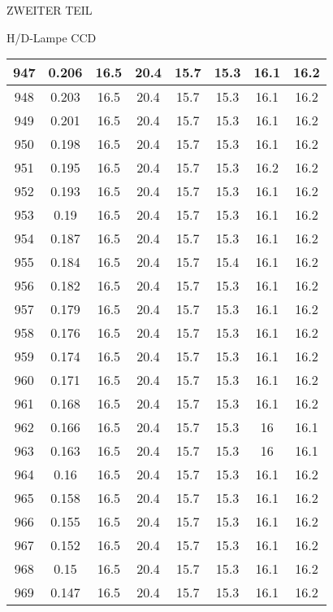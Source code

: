 \begin{appendix}
\begin{chapter}{ZWEITER TEIL}
\begin{section}{H/D-Lampe CCD}
\begin{scriptsize}
\begin{longtable}[htbp]{|c|c|c|c|c|c|c|c|}
            947 & 0.206 & 16.5 & 20.4 & 15.7 & 15.3 & 16.1 & 16.2 \\ \hline
            948 & 0.203 & 16.5 & 20.4 & 15.7 & 15.3 & 16.1 & 16.2 \\ \hline
            949 & 0.201 & 16.5 & 20.4 & 15.7 & 15.3 & 16.1 & 16.2 \\ \hline
            950 & 0.198 & 16.5 & 20.4 & 15.7 & 15.3 & 16.1 & 16.2 \\ \hline
            951 & 0.195 & 16.5 & 20.4 & 15.7 & 15.3 & 16.2 & 16.2 \\ \hline
            952 & 0.193 & 16.5 & 20.4 & 15.7 & 15.3 & 16.1 & 16.2 \\ \hline
            953 & 0.19 & 16.5 & 20.4 & 15.7 & 15.3 & 16.1 & 16.2 \\ \hline
            954 & 0.187 & 16.5 & 20.4 & 15.7 & 15.3 & 16.1 & 16.2 \\ \hline
            955 & 0.184 & 16.5 & 20.4 & 15.7 & 15.4 & 16.1 & 16.2 \\ \hline
            956 & 0.182 & 16.5 & 20.4 & 15.7 & 15.3 & 16.1 & 16.2 \\ \hline
            957 & 0.179 & 16.5 & 20.4 & 15.7 & 15.3 & 16.1 & 16.2 \\ \hline
            958 & 0.176 & 16.5 & 20.4 & 15.7 & 15.3 & 16.1 & 16.2 \\ \hline
            959 & 0.174 & 16.5 & 20.4 & 15.7 & 15.3 & 16.1 & 16.2 \\ \hline
            960 & 0.171 & 16.5 & 20.4 & 15.7 & 15.3 & 16.1 & 16.2 \\ \hline
            961 & 0.168 & 16.5 & 20.4 & 15.7 & 15.3 & 16.1 & 16.2 \\ \hline
            962 & 0.166 & 16.5 & 20.4 & 15.7 & 15.3 & 16 & 16.1 \\ \hline
            963 & 0.163 & 16.5 & 20.4 & 15.7 & 15.3 & 16 & 16.1 \\ \hline
            964 & 0.16 & 16.5 & 20.4 & 15.7 & 15.3 & 16.1 & 16.2 \\ \hline
            965 & 0.158 & 16.5 & 20.4 & 15.7 & 15.3 & 16.1 & 16.2 \\ \hline
            966 & 0.155 & 16.5 & 20.4 & 15.7 & 15.3 & 16.1 & 16.2 \\ \hline
            967 & 0.152 & 16.5 & 20.4 & 15.7 & 15.3 & 16.1 & 16.2 \\ \hline
            968 & 0.15 & 16.5 & 20.4 & 15.7 & 15.3 & 16.1 & 16.2 \\ \hline
            969 & 0.147 & 16.5 & 20.4 & 15.7 & 15.3 & 16.1 & 16.2 \\ \hline

\end{longtable}
\end{scriptsize}
\end{section}
\end{chapter}
\end{appendix}
